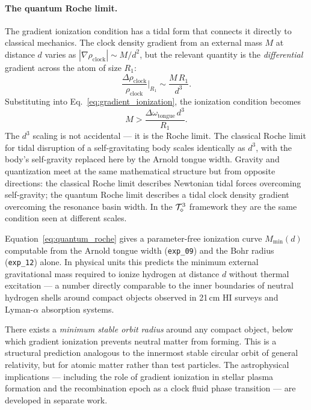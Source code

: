 \paragraph{The quantum Roche limit.}
The gradient ionization condition has a tidal form that connects it
directly to classical mechanics.
The clock density gradient from an external mass $M$ at distance $d$
varies as $|\nabla\rho_\text{clock}| \sim M/d^2$, but the relevant
quantity is the \emph{differential} gradient across the atom of size
$R_1$:
\begin{equation}
    \frac{\Delta\rho_\text{clock}}{\rho_\text{clock}}\bigg|_{R_1}
        \sim \frac{M\,R_1}{d^3}.
    \label{eq:tidal_gradient}
\end{equation}
Substituting into Eq.~\eqref{eq:gradient_ionization}, the ionization
condition becomes
\begin{equation}
    M > \frac{\Delta\omega_\text{tongue}\,d^3}{R_1}.
    \label{eq:quantum_roche}
\end{equation}
The $d^3$ scaling is not accidental --- it is the Roche limit.
The classical Roche limit for tidal disruption of a self-gravitating
body scales identically as $d^3$, with the body's self-gravity replaced
here by the Arnold tongue width.
Gravity and quantization meet at the same mathematical structure but
from opposite directions: the classical Roche limit describes Newtonian
tidal forces overcoming self-gravity; the quantum Roche limit describes
a tidal clock density gradient overcoming the resonance basin width.
In the $\mathcal{T}_\diamond^3$ framework they are the same condition seen at
different scales.

Equation~\eqref{eq:quantum_roche} gives a parameter-free ionization
curve $M_\text{min}(d)$ computable from the Arnold tongue width
(\texttt{exp\_09}) and the Bohr radius (\texttt{exp\_12}) alone.
In physical units this predicts the minimum external gravitational mass
required to ionize hydrogen at distance $d$ without thermal excitation
--- a number directly comparable to the inner boundaries of neutral
hydrogen shells around compact objects observed in 21\,cm HI surveys
and Lyman-$\alpha$ absorption systems.

There exists a \emph{minimum stable orbit radius} around any compact
object, below which gradient ionization prevents neutral matter from
forming.
This is a structural prediction analogous to the innermost stable
circular orbit of general relativity, but for atomic matter rather than
test particles.
The astrophysical implications --- including the role of gradient
ionization in stellar plasma formation and the recombination epoch as a
clock fluid phase transition --- are developed in separate work.

